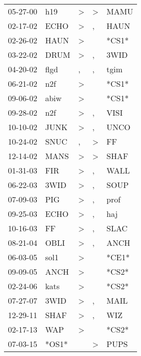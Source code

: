 \begin{supertabular}{lllll}
 05-27-00 &    h19 &  \textgreater &  \textgreater &   MAMU \\
 02-17-02 &   ECHO &  \textgreater &             , &   HAUN \\
 02-26-02 &   HAUN &  \textgreater &               &  *CS1* \\
 03-22-02 &   DRUM &  \textgreater &             , &   3WID \\
 04-20-02 &   flgd &             , &             , &   tgim \\
 06-21-02 &    n2f &  \textgreater &               &  *CS1* \\
 09-06-02 &   abiw &  \textgreater &               &  *CS1* \\
 09-28-02 &    n2f &  \textgreater &             , &   VISI \\
 10-10-02 &   JUNK &  \textgreater &             , &   UNCO \\
 10-24-02 &   SNUC &             , &  \textgreater &     FF \\
 12-14-02 &   MANS &  \textgreater &  \textgreater &   SHAF \\
 01-31-03 &    FIR &  \textgreater &             , &   WALL \\
 06-22-03 &   3WID &  \textgreater &             , &   SOUP \\
 07-09-03 &    PIG &  \textgreater &             , &   prof \\
 09-25-03 &   ECHO &  \textgreater &             , &    haj \\
 10-16-03 &     FF &  \textgreater &             , &   SLAC \\
 08-21-04 &   OBLI &  \textgreater &             , &   ANCH \\
 06-03-05 &   sol1 &  \textgreater &               &  *CE1* \\
 09-09-05 &   ANCH &  \textgreater &               &  *CS2* \\
 02-24-06 &   kats &  \textgreater &               &  *CS2* \\
 07-27-07 &   3WID &  \textgreater &             , &   MAIL \\
 12-29-11 &   SHAF &  \textgreater &             , &    WIZ \\
 02-17-13 &    WAP &  \textgreater &               &  *CS2* \\
 07-03-15 &  *OS1* &               &  \textgreater &   PUPS \\
\end{supertabular}

